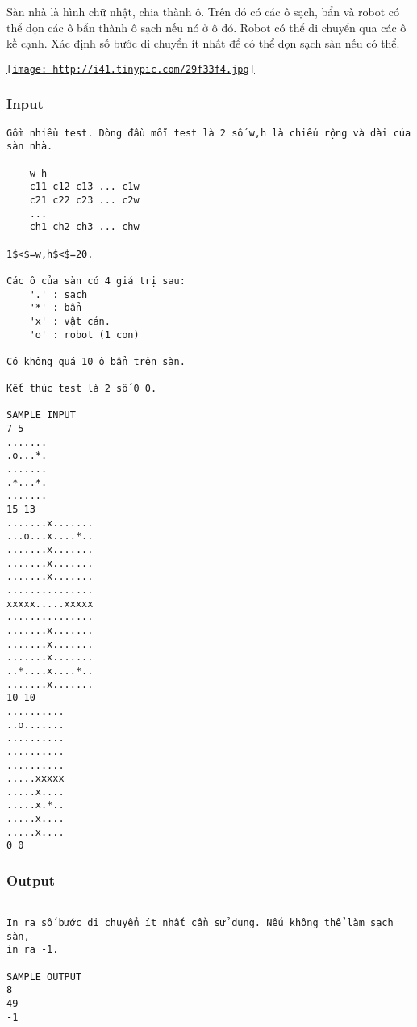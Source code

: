 

Sàn nhà là hình chữ nhật, chia thành ô. Trên đó có các ô sạch, bẩn và robot có thể dọn các ô bẩn thành ô sạch nếu nó ở ô đó. Robot có thể di chuyển qua các ô kề cạnh. Xác định số bước di chuyển ít nhất để có thể dọn sạch sàn nếu có thể.

\href{http://tinypic.com}{
\texttt{[image: http://i41.tinypic.com/29f33f4.jpg]}}

\subsubsection{Input}
\begin{verbatim}
Gồm nhiều test. Dòng đầu mỗi test là 2 số w,h là chiểu rộng và dài của sàn nhà. 

    w h
    c11 c12 c13 ... c1w
    c21 c22 c23 ... c2w
    ...
    ch1 ch2 ch3 ... chw

1$<$=w,h$<$=20.

Các ô của sàn có 4 giá trị sau:
    '.' : sạch
    '*' : bẩn
    'x' : vật cản.
    'o' : robot (1 con)

Có không quá 10 ô bẩn trên sàn. 

Kết thúc test là 2 số 0 0.

SAMPLE INPUT
7 5
.......
.o...*.
.......
.*...*.
.......
15 13
.......x.......
...o...x....*..
.......x.......
.......x.......
.......x.......
...............
xxxxx.....xxxxx
...............
.......x.......
.......x.......
.......x.......
..*....x....*..
.......x.......
10 10
..........
..o.......
..........
..........
..........
.....xxxxx
.....x....
.....x.*..
.....x....
.....x....
0 0

\end{verbatim}

\subsubsection{Output}
\begin{verbatim}
 
In ra số bước di chuyển ít nhất cần sử dụng. Nếu không thể làm sạch sàn, 
in ra -1. 

SAMPLE OUTPUT
8
49
-1
\end{verbatim}